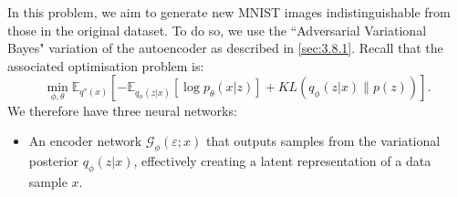\documentclass[honours,12pt]{unswthesis}
\newcommand{\E}{\mathbb{E}}
\numberwithin{equation}{section}
\theoremstyle{definition}
\begin{document}
In this problem, we aim to generate new MNIST images indistinguishable from those in the original dataset. To do so, we use the ``Adversarial Variational Bayes" variation of the autoencoder as described in \autoref{sec:3.8.1}. Recall that the associated optimisation problem is:
\[\min_{\phi,\theta}\E_{q^*(x)}\left[-\E_{q_\phi(z|x)}[\log p_\theta(x|z)]+KL(q_\phi(z|x)\|p(z))\right].\]
We therefore have three neural networks:
\begin{itemize}
\item An encoder network $\mathcal{G}_\phi(\varepsilon;x)$ that outputs samples from the variational posterior $q_\phi(z|x)$, effectively creating a latent representation of a data sample $x$.
\begin{figure}[h!]
\end{figure}
\end{itemize}
\end{document}
